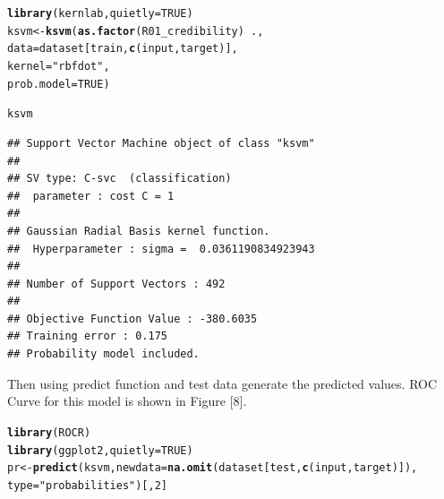 \documentclass{article}\usepackage[]{graphicx}\usepackage[]{color}
\makeatletter
\newcommand{\hlnum}[1]{\textcolor[rgb]{0.686,0.059,0.569}{#1}}%
\newcommand{\hlstr}[1]{\textcolor[rgb]{0.192,0.494,0.8}{#1}}%
\newcommand{\hlopt}[1]{\textcolor[rgb]{0,0,0}{#1}}%
\newcommand{\hlstd}[1]{\textcolor[rgb]{0.345,0.345,0.345}{#1}}%
\newcommand{\hlkwb}[1]{\textcolor[rgb]{0.69,0.353,0.396}{#1}}%
\newcommand{\hlkwc}[1]{\textcolor[rgb]{0.333,0.667,0.333}{#1}}%
\newcommand{\hlkwd}[1]{\textcolor[rgb]{0.737,0.353,0.396}{\textbf{#1}}}%
\newenvironment{kframe}{%
 \def\at@end@of@kframe{}%
 \ifinner\ifhmode%
  \def\at@end@of@kframe{\end{minipage}}%
  \begin{minipage}{\columnwidth}%
 \fi\fi%
 \def\FrameCommand##1{\hskip\@totalleftmargin \hskip-\fboxsep
 \colorbox{shadecolor}{##1}\hskip-\fboxsep
     \hskip-\linewidth \hskip-\@totalleftmargin \hskip\columnwidth}%
 \MakeFramed {\advance\hsize-\width
   \@totalleftmargin\z@ \linewidth\hsize
   \@setminipage}}%
 {\par\unskip\endMakeFramed%
 \at@end@of@kframe}
\newenvironment{knitrout}{}{} %
\makeatother
\begin{document}
\begin{knitrout}
\color{fgcolor}\begin{kframe}
\begin{alltt}
\hlkwd{library}\hlstd{(kernlab,} \hlkwc{quietly}\hlstd{=}\hlnum{TRUE}\hlstd{)}
\hlstd{ksvm} \hlkwb{<-} \hlkwd{ksvm}\hlstd{(}\hlkwd{as.factor}\hlstd{(R01_credibility)} \hlopt{~} \hlstd{.,}
                 \hlkwc{data}\hlstd{=dataset[train,}\hlkwd{c}\hlstd{(input, target)],}
                 \hlkwc{kernel}\hlstd{=}\hlstr{"rbfdot"}\hlstd{,}
                 \hlkwc{prob.model}\hlstd{=}\hlnum{TRUE}\hlstd{)}
\end{alltt}
\end{kframe}
\end{knitrout}
\begin{knitrout}
\color{fgcolor}\begin{kframe}
\begin{alltt}
\hlstd{ksvm}
\end{alltt}
\begin{verbatim}
## Support Vector Machine object of class "ksvm" 
## 
## SV type: C-svc  (classification) 
##  parameter : cost C = 1 
## 
## Gaussian Radial Basis kernel function. 
##  Hyperparameter : sigma =  0.0361190834923943 
## 
## Number of Support Vectors : 492 
## 
## Objective Function Value : -380.6035 
## Training error : 0.175 
## Probability model included.
\end{verbatim}
\end{kframe}
\end{knitrout}
Then using predict function and test data generate the predicted values. ROC Curve for this model is shown in Figure [8].
\begin{knitrout}
\color{fgcolor}\begin{kframe}
\begin{alltt}
\hlkwd{library}\hlstd{(ROCR)}
\hlkwd{library}\hlstd{(ggplot2,} \hlkwc{quietly}\hlstd{=}\hlnum{TRUE}\hlstd{)}
\hlstd{pr} \hlkwb{<-} \hlkwd{predict}\hlstd{(ksvm,} \hlkwc{newdata}\hlstd{=}\hlkwd{na.omit}\hlstd{(dataset[test,} \hlkwd{c}\hlstd{(input, target)]),}
            \hlkwc{type}\hlstd{=}\hlstr{"probabilities"}\hlstd{)[,}\hlnum{2}\hlstd{]}
\end{alltt}
\end{kframe}
\end{knitrout}
\end{document}
